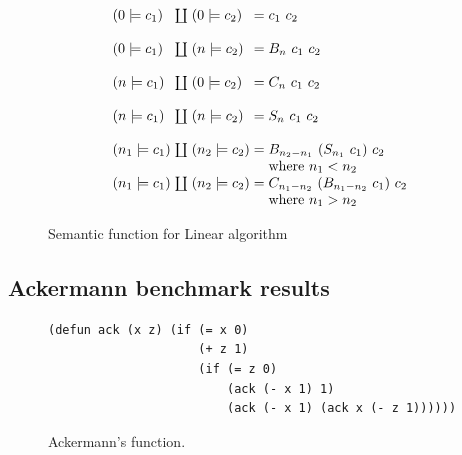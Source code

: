 \documentclass[conference]{IEEEtran}
\begin{document}
\begin{figure}
    \begin{equation*}
        \arraycolsep=1.4pt
        \begin{array}{l l l l l}
            (0 \models c_1)   & \coprod & (0 \models c_2)   & = & c_1 \ c_2                               \\
            \\
            (0 \models c_1)   & \coprod & (n \models c_2)   & = & B_n \ c_1 \ c_2                         \\
            \\
            (n \models c_1)   & \coprod & (0 \models c_2)   & = & C_n \ c_1 \ c_2                         \\
            \\
            (n \models c_1)   & \coprod & (n \models c_2)   & = & S_n \ c_1 \ c_2                         \\
            \\
            (n_1 \models c_1) & \coprod & (n_2 \models c_2) & = & B_{n_2-n_1} \ (S_{n_1} \ c_1) \ c_2     \\
                              &         &                   &   & \text{where } n_1 < n_2                 \\
            (n_1 \models c_1) & \coprod & (n_2 \models c_2) & = & C_{n_1-n_2} \ (B_{n_1-n_2} \ c_1) \ c_2 \\
                              &         &                   &   & \text{where } n_1 > n_2                 \\
        \end{array}
    \end{equation*}
    \centering
    \caption{Semantic function for Linear algorithm}
    \label{fig:linear-sem}
\end{figure}

\FloatBarrier
\subsection{Ackermann benchmark results}
\label{app:ack}

\begin{figure}
    \begin{lstlisting}
(defun ack (x z) (if (= x 0)
                     (+ z 1)
                     (if (= z 0)
                         (ack (- x 1) 1)
                         (ack (- x 1) (ack x (- z 1))))))
    \end{lstlisting}
    \centering
    \caption{
        Ackermann's function.
    }
    \label{fig:ack}
\end{figure}
\end{document}
